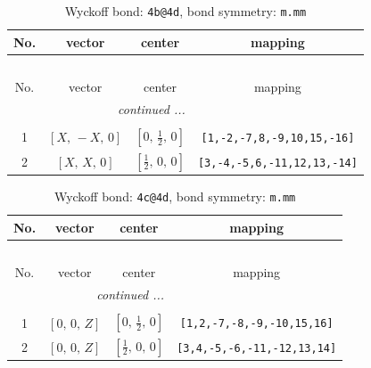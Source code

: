 \documentclass[fleqn,8pt]{jsarticle}
\begin{document}
\renewcommand{\arraystretch}{1.2}
\begin{longtable}{cccc}
\caption{Wyckoff bond: {\tt 4b@4d}, bond symmetry: {\tt m.mm}}
 \\
 \hline \hline
No. & vector & center & mapping \\ \hline \endfirsthead

\multicolumn{3}{l}{\tablename\ \thetable{}} \\
 \hline \hline
No. & vector & center & mapping \\ \hline \endhead

 \hline \hline
\multicolumn{3}{r}{\footnotesize\it continued ...} \\ \endfoot

 \hline \hline
\multicolumn{3}{r}{} \\ \endlastfoot

1 & $\left[ X,\, - X,\, 0 \right]$ & $\left[ 0,\, \frac{1}{2},\, 0 \right]$ & {\tt [1,-2,-7,8,-9,10,15,-16]} \\ \hline
2 & $\left[ X,\, X,\, 0 \right]$ & $\left[ \frac{1}{2},\, 0,\, 0 \right]$ & {\tt [3,-4,-5,6,-11,12,13,-14]} \\
\end{longtable}
\renewcommand{\arraystretch}{1.2}
\begin{longtable}{cccc}
\caption{Wyckoff bond: {\tt 4c@4d}, bond symmetry: {\tt m.mm}}
 \\
 \hline \hline
No. & vector & center & mapping \\ \hline \endfirsthead

\multicolumn{3}{l}{\tablename\ \thetable{}} \\
 \hline \hline
No. & vector & center & mapping \\ \hline \endhead

 \hline \hline
\multicolumn{3}{r}{\footnotesize\it continued ...} \\ \endfoot

 \hline \hline
\multicolumn{3}{r}{} \\ \endlastfoot

1 & $\left[ 0,\, 0,\, Z \right]$ & $\left[ 0,\, \frac{1}{2},\, 0 \right]$ & {\tt [1,2,-7,-8,-9,-10,15,16]} \\ \hline
2 & $\left[ 0,\, 0,\, Z \right]$ & $\left[ \frac{1}{2},\, 0,\, 0 \right]$ & {\tt [3,4,-5,-6,-11,-12,13,14]} \\
\end{longtable}
\renewcommand{\arraystretch}{1.2}
\end{document}
